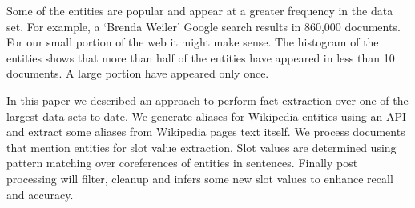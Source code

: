 
Some of the entities are popular and appear at a greater frequency in the data set.
For example, a `Brenda Weiler' Google search results in 860,000 documents.
For our small portion of the web it might make sense.
The histogram of the entities shows that more than half of the entities have appeared in less than 10 documents.
A large portion have appeared only once.






In this paper we described an approach to perform fact extraction over one of the largest data sets to date. 
We generate aliases for Wikipedia entities using an API and extract some aliases from Wikipedia pages text itself.
We process documents that mention entities for slot value extraction.
Slot values are determined using pattern matching over coreferences of entities in sentences. Finally post processing will filter, cleanup and infers some new slot values to enhance recall and accuracy. 

